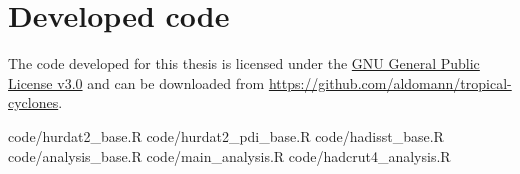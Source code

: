 \section{Developed code}\label{app:code}
\renewcommand{\lstlistingname}{Script}
The code developed for this thesis is licensed under the \href{https://www.gnu.org/licenses/gpl-3.0.en.html}{GNU General Public License v3.0} and can be downloaded from \url{https://github.com/aldomann/tropical-cyclones}.

%
	{code/hurdat2_base.R}
%
	{code/hurdat2_pdi_base.R}
%
	{code/hadisst_base.R}
%
	{code/analysis_base.R}
%
	{code/main_analysis.R}
%
	{code/hadcrut4_analysis.R}


